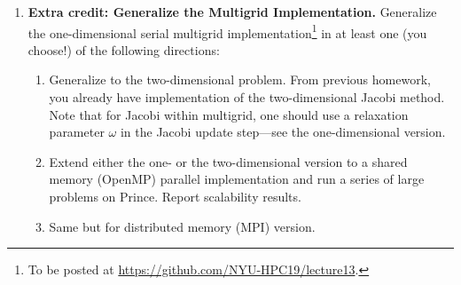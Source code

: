 \documentclass[12pt]{article}
\begin{document}
\begin{enumerate}
  

\item {\bf Extra credit: Generalize the Multigrid Implementation.} Generalize the
  one-dimensional serial multigrid
  implementation\footnote{To be posted at \url{https://github.com/NYU-HPC19/lecture13}.}
  in at least one (you choose!) of the following directions:
  \begin{enumerate}
    \item Generalize to the two-dimensional problem. From previous
      homework, you already have implementation of the two-dimensional
      Jacobi method. Note that for Jacobi within multigrid, one should
      use a relaxation parameter $\omega$ in the Jacobi update
      step---see the one-dimensional version.
    \item Extend either the one- or the two-dimensional version to a
      shared memory (OpenMP) parallel implementation and run a series
      of large problems on Prince. Report scalability results.
    \item Same but for distributed memory (MPI) version.
  \end{enumerate}


\end{enumerate}
\end{document}
